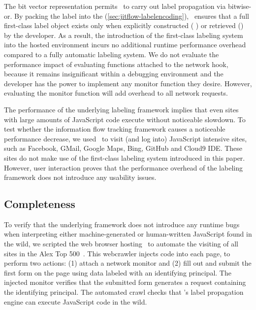 The bit vector representation permits \JitFlow\ to carry out label propagation via bitwise-or.
By packing the label into the \jsvalue (\autoref{sec:jitflow-labelencoding}), \JitFlow\ ensures that a full first-class label object exists only when explicitly constructed ( \FlowLabel) or retrieved (\mlabelof) by the developer.
As a result, the introduction of the first-class labeling system into the hosted environment incurs no additional runtime performance overhead compared to a fully automatic labeling system.
We do not evaluate the performance impact of evaluating functions attached to the network hook, because it remains insignificant within a debugging environment and the developer has the power to implement any monitor function they desire.
However, evaluating the monitor function will add overhead to all network requests.

The performance of the underlying labeling framework implies that even sites with large amounts of JavaScript code execute without noticeable slowdown.
To test whether the information flow tracking framework causes a noticeable performance decrease, we used \JitFlow\ to visit (and log into) JavaScript intensive sites, such as Facebook, GMail, Google Maps, Bing, GitHub and Cloud9 IDE.
These sites do not make use of the first-class labeling system introduced in this paper.
However, user interaction proves that the performance overhead of the labeling framework does not introduce any usability issues.

\subsection{Completeness}

To verify that the underlying framework does not introduce any runtime bugs when interpreting either machine-generated or human-written JavaScript found in the wild, we scripted the web browser hosting \JitFlow\ to automate the visiting of all sites in the Alex Top 500~\cite{alexa}.
This webcrawler injects code into each page, to perform two actions: (1) attach a network monitor and (2) fill out and submit the first form on the page using data labeled with an identifying principal.
The injected monitor verifies that the submitted form generates a request containing the identifying principal.
The automated crawl checks that \JitFlow's label propagation engine can execute JavaScript code in the wild.

